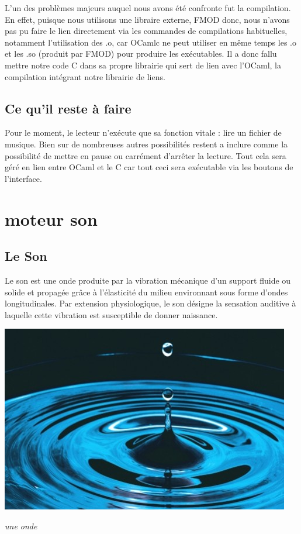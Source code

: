 \documentclass[12pt]{report}
\begin{document}
L'un des problèmes majeurs auquel nous avons été confronte fut la compilation. En effet, puisque nous utilisons une libraire externe, FMOD donc, nous n'avons pas pu faire le lien directement via les commandes de compilations habituelles, notamment l'utilisation des .o, car OCamlc ne peut utiliser en même temps les .o et les .so (produit par FMOD) pour produire les exécutables. Il a donc fallu mettre notre code C dans sa propre librairie qui sert de lien avec l'OCaml, la compilation intégrant notre librairie de liens.\\

\section{Ce qu'il reste à faire}

Pour le moment, le lecteur n'exécute que sa fonction vitale : lire un fichier de musique. Bien sur de nombreuses autres possibilités restent a inclure comme la possibilité de mettre en pause ou carrément d'arrêter la lecture. Tout cela sera géré en lien entre OCaml et le C car tout ceci sera exécutable via les boutons de l'interface.\\

\chapter{moteur son}

\section{Le Son}


Le son est une onde produite par la vibration mécanique d'un support fluide ou solide et propagée grâce à l'élasticité du milieu environnant sous forme d'ondes longitudinales. Par extension physiologique, le son désigne la sensation auditive à laquelle cette vibration est susceptible de donner naissance.\\
\begin{center}
\includegraphics[scale=0.5]{onde.jpg}

\it{ une onde}
\end{center}
\end{document}
